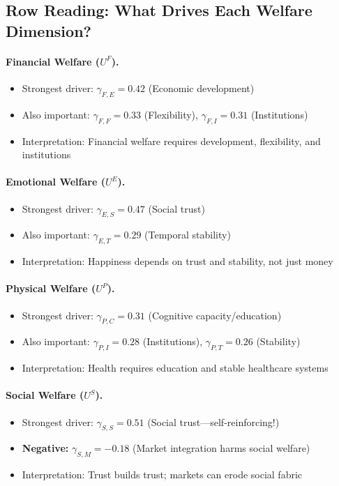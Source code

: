 \subsection{Row Reading: What Drives Each Welfare Dimension?}

\paragraph{Financial Welfare ($U^F$).}
\begin{itemize}
\item Strongest driver: $\gamma_{F,E} = 0.42$ (Economic development)
\item Also important: $\gamma_{F,F} = 0.33$ (Flexibility), $\gamma_{F,I} = 0.31$ (Institutions)
\item Interpretation: Financial welfare requires development, flexibility, and institutions
\end{itemize}

\paragraph{Emotional Welfare ($U^E$).}
\begin{itemize}
\item Strongest driver: $\gamma_{E,S} = 0.47$ (Social trust)
\item Also important: $\gamma_{E,T} = 0.29$ (Temporal stability)
\item Interpretation: Happiness depends on trust and stability, not just money
\end{itemize}

\paragraph{Physical Welfare ($U^P$).}
\begin{itemize}
\item Strongest driver: $\gamma_{P,C} = 0.31$ (Cognitive capacity/education)
\item Also important: $\gamma_{P,I} = 0.28$ (Institutions), $\gamma_{P,T} = 0.26$ (Stability)
\item Interpretation: Health requires education and stable healthcare systems
\end{itemize}

\paragraph{Social Welfare ($U^S$).}
\begin{itemize}
\item Strongest driver: $\gamma_{S,S} = 0.51$ (Social trust---self-reinforcing!)
\item \textbf{Negative:} $\gamma_{S,M} = -0.18$ (Market integration harms social welfare)
\item Interpretation: Trust builds trust; markets can erode social fabric
\end{itemize}

